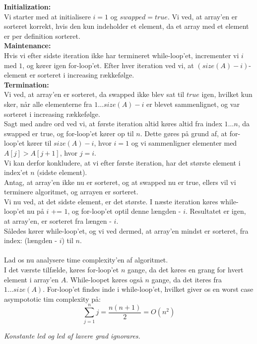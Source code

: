 \documentclass[a4paper,12pt]{article}
\begin{document}
\textbf{Initialization:}\\
Vi starter med at initialisere $i = 1$ og $swapped = true$. Vi ved, at array'en er sorteret korrekt, hvis den kun indeholder et element, da et array med et element er per definition sorteret.\\

\textbf{Maintenance:}\\
Hvis vi efter sidste iteration ikke har termineret while-loop'et, incrementer vi $i$ med $1$, og kører igen for-loop'et. Efter hver iteration ved vi, at $(size(A)-i)$-element er sorteret i increasing rækkefølge.\\

\textbf{Termination:}\\
Vi ved, at array'en er sorteret, da swapped ikke blev sat til $true$ igen, hvilket kun sker, når alle elementerne fra $1\dots size(A)-i$ er blevet sammenlignet, og var sorteret i increasing rækkefølge.\\

Sagt med andre ord ved vi, at første iteration altid køres altid fra index $1\dots n$, da swapped er true, og for-loop'et kører op til $n$. Dette gøres på grund af, at for-loop'et kører til $size(A) - i$, hvor $i = 1$ og vi sammenligner elementer med $A[j] > A[j+1]$, hvor $j = i$.\\
Vi kan derfor konkludere, at vi efter første iteration, har det største element i index'et $n$ (sidste element).\\
Antag, at array'en ikke nu er sorteret, og at swapped nu er true, ellers vil vi terminere algoritmet, og arrayen er sorteret.\\
Vi nu ved, at det sidste element, er det største. I næste iteration køres while-loop'et nu på $i$ += $1$, og for-loop'et optil denne længden - $i$. Resultatet er igen, at array'en, er sorteret fra længen - $i$.\\ 
Således kører while-loop'et, og vi ved dermed, at array'en mindst er sorteret, fra index: (længden - $i$) til $n$.\\
\\
Lad os nu analysere time complexity'en af algoritmet.\\
I det værste tilfælde, køres for-loop'et $n$ gange, da det køres en grang for hvert element i array'en $A$. While-loopet køres også $n$ gange, da det iteres fra $1\dots size(A)$. For-loop'et findes inde i while-loop'et, hvilket giver os en worst case asympototic tim complexity på:\\
\[\sum_{j=1}^{n}j = \dfrac{n(n+1)}{2} = O(n^2)\]
\begin{center}
    \textit{Konstante led og led af lavere grad ignorares.}
\end{center}
\end{document}
